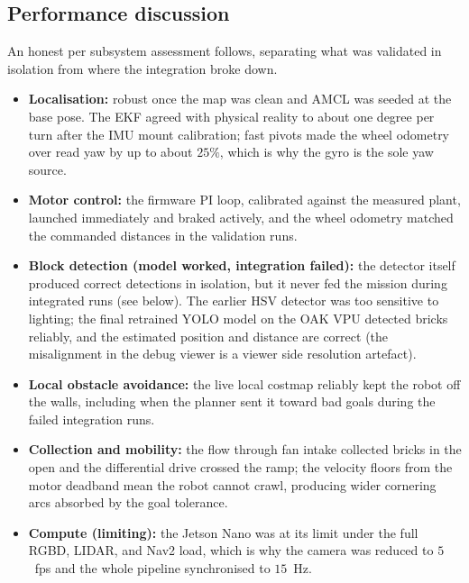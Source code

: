 \documentclass[11pt]{article}
\begin{document}
\subsection{Performance discussion}\label{sec:perfdiscuss}
An honest per subsystem assessment follows, separating what was validated in isolation from where the integration broke down.
\begin{itemize}[noitemsep]
    \item \textbf{Localisation:} robust once the map was clean and AMCL was seeded at the base pose. The EKF agreed with physical reality to about one degree per turn after the IMU mount calibration; fast pivots made the wheel odometry over read yaw by up to about $25\%$, which is why the gyro is the sole yaw source.
    \item \textbf{Motor control:} the firmware PI loop, calibrated against the measured plant, launched immediately and braked actively, and the wheel odometry matched the commanded distances in the validation runs.
    \item \textbf{Block detection (model worked, integration failed):} the detector itself produced correct detections in isolation, but it never fed the mission during integrated runs (see below). The earlier HSV detector was too sensitive to lighting; the final retrained YOLO model on the OAK VPU detected bricks reliably, and the estimated position and distance are correct (the misalignment in the debug viewer is a viewer side resolution artefact).
    \item \textbf{Local obstacle avoidance:} the live local costmap reliably kept the robot off the walls, including when the planner sent it toward bad goals during the failed integration runs.
    \item \textbf{Collection and mobility:} the flow through fan intake collected bricks in the open and the differential drive crossed the ramp; the velocity floors from the motor deadband mean the robot cannot crawl, producing wider cornering arcs absorbed by the goal tolerance.
    \item \textbf{Compute (limiting):} the Jetson Nano was at its limit under the full RGBD, LIDAR, and Nav2 load, which is why the camera was reduced to $5$~fps and the whole pipeline synchronised to $15$~Hz.
\end{itemize}
\end{document}
